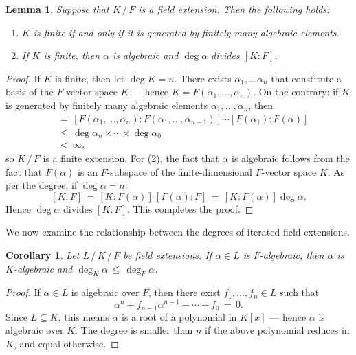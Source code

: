 \documentclass[11pt]{article}
\newtheorem{lemma}{Lemma}
\newtheorem{corollary}{Corollary}
\begin{document}
\begin{adjustwidth}{0.5cm}{}
  \begin{lemma}
    Suppose that $K \, / \, F$ is a field extension. Then the following holds:
    \begin{enumerate}
      \item $K$ is finite if and only if it is generated by finitely many algebraic elements.
      \item If $K$ is finite, then $\alpha$ is algebraic and $\deg \alpha$ divides $[K : F]$.
    \end{enumerate}
  \end{lemma}
  \begin{proof}
    If $K$ is finite, then let $\deg K = n$. There exists $\alpha_{1}, \ldots \alpha_{n}$ that constitute a basis of the $F$-vector space $K$ --- hence $K = F(\alpha_{1}, \ldots, \alpha_{n})$. On the contrary: if $K$ is generated by finitely many algebraic elements $\alpha_{1}, \ldots, \alpha_{n}$, then
    \begin{align*}
      [F(\alpha_{1}, \ldots, \alpha_{n}) : F] \, &= \, [F(\alpha_{1}, \ldots, \alpha_{n}) : F(\alpha_{1}, \ldots, \alpha_{n - 1})] \cdots [F(\alpha_{1}) : F(\alpha)] \\
                                                 &\le \, \deg \alpha_{n} \times \cdots \times \deg \alpha_{0} \\
                                                 &< \, \infty,
    \end{align*}
    so $K \, / \, F$ is a finite extension. For (2), the fact that $\alpha$ is algebraic follows from the fact that $F(\alpha)$ is an $F$-subspace of the finite-dimensional $F$-vector space $K$. As per the degree: if $\deg \alpha = n$:
    \[
      [K : F] \, = \, [K : F(\alpha)] \, [F(\alpha) : F] \, = \, [K : F(\alpha)] \deg \alpha.
    \]
    Hence $\deg \alpha$ divides $[K : F]$. This completes the proof.
  \end{proof}
\end{adjustwidth}

We now examine the relationship between the degrees of iterated field extensions.

\begin{adjustwidth}{0.5cm}{}
  \begin{corollary}
    Let $L \, / \, K \, / \, F$ be field extensions. If $\alpha \in L$ is $F$-algebraic, then $\alpha$ is $K$-algebraic and $\deg_{K} \alpha \, \le \, \deg_{F} \alpha$.
  \end{corollary}
  \begin{proof}
    If $\alpha \in L$ is algebraic over $F$, then there exist $f_{1}, \ldots, f_{n} \in L$ such that
    \[
      \alpha^{n} + f_{n - 1} \alpha^{n - 1} + \cdots + f_{0} \, = \, 0.
    \]
    Since $L \subseteq K$, this means $\alpha$ is a root of a polynomial in $K[x]$ --- hence $\alpha$ is algebraic over $K$. The degree is smaller than $n$ if the above polynomial reduces in $K$, and equal otherwise.
  \end{proof}
\end{adjustwidth}
\end{document}
